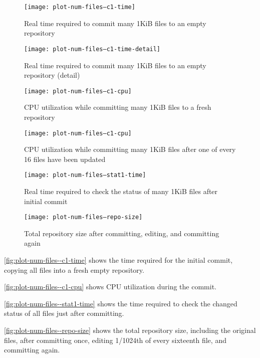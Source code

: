 \begin{figure}[p]
  \caption{Real time required to commit many 1KiB files to an empty repository}
  \label{fig:plot-num-files--c1-time}
  \centering
    \texttt{[image: plot-num-files--c1-time]}
\end{figure}

\begin{figure}[p]
  \caption{Real time required to commit many 1KiB files to an empty repository
  (detail)}
  \label{fig:plot-num-files--c1-time-detail}
  \centering
    \texttt{[image: plot-num-files--c1-time-detail]}
\end{figure}

\begin{figure}[p]
  \caption{CPU utilization while committing many 1KiB files to a fresh
  repository}
  \label{fig:plot-num-files--c1-cpu}
  \centering
    \texttt{[image: plot-num-files--c1-cpu]}
\end{figure}

\begin{figure}[p]
    \caption{CPU utilization while committing many 1KiB files after one of every
        \num{16} files have been updated}
  \label{fig:plot-num-files--c1-cpu}
  \centering
    \texttt{[image: plot-num-files--c1-cpu]}
\end{figure}

\begin{figure}[p]
  \caption{Real time required to check the status of many 1KiB files after
  initial commit}
  \label{fig:plot-num-files--stat1-time}
  \centering
    \texttt{[image: plot-num-files--stat1-time]}
\end{figure}

\begin{figure}[p]
  \caption{Total repository size after committing, editing, and committing again}
  \label{fig:plot-num-files--repo-size}
  \centering
    \texttt{[image: plot-num-files--repo-size]}
\end{figure}

\autoref{fig:plot-num-files--c1-time} shows the time
required for the initial commit, copying all files into a fresh empty
repository.

\autoref{fig:plot-num-files--c1-cpu} shows CPU utilization
during the commit.

\autoref{fig:plot-num-files--stat1-time} shows the time
required to check the changed status of all files just after committing.

\autoref{fig:plot-num-files--repo-size} shows the total
repository size, including the original files, after committing once, editing
1/1024th of every sixteenth file, and committing again.


